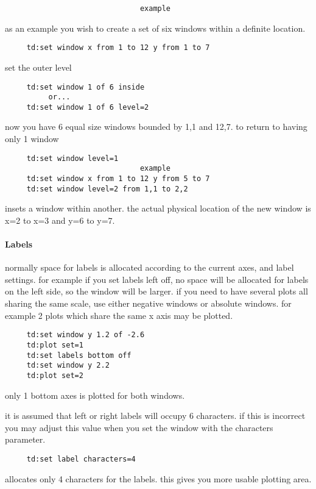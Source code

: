 \begin{verbatim}
                               example
\end{verbatim}
as  an  example  you  wish  to  create  a set of six windows within a
definite location.  
\begin{verbatim}
     td:set window x from 1 to 12 y from 1 to 7 
\end{verbatim}
set the outer level 
\begin{verbatim}
     td:set window 1 of 6 inside 
          or...  
     td:set window 1 of 6 level=2 
\end{verbatim}
now you have 6 equal size windows bounded by 1,1 and 12,7.  to return
to having only 1 window 
\begin{verbatim}
     td:set window level=1 
                               example
     td:set window x from 1 to 12 y from 5 to 7 
     td:set window level=2 from 1,1 to 2,2 
\end{verbatim}
insets  a window within another.  the actual physical location of the
new window is x=2 to x=3 and y=6 to y=7.  
\paragraph{Labels}
normally space for labels is allocated according to the current axes,
and label settings.  for example if you set labels left off, no space
will  be allocated for labels on the left side, so the window will be
larger.  if you need to have  several  plots  all  sharing  the  same
scale,  use either negative windows or absolute windows.  for example
2 plots which share the same x axis may be plotted.  
\begin{verbatim}
     td:set window y 1.2 of -2.6 
     td:plot set=1 
     td:set labels bottom off 
     td:set window y 2.2 
     td:plot set=2 
\end{verbatim}
only 1 bottom axes is plotted for both windows.  

it is assumed that left or right labels will occupy 6 characters.  if
this is incorrect you may adjust this value when you set  the  window
with the characters parameter.  
\begin{verbatim}
     td:set label characters=4 
\end{verbatim}
allocates  only  4  characters  for  the labels.  this gives you more
usable plotting area.  
